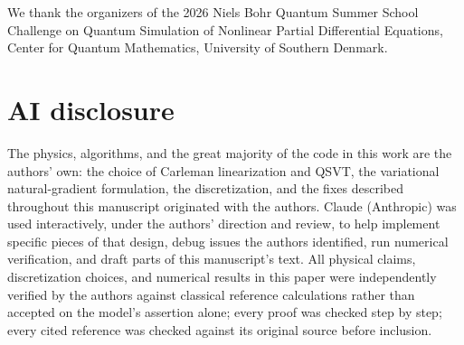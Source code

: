 \documentclass[aps,pra,twocolumn,notitlepage,superscriptaddress,floatfix,10pt]{revtex4-2}
\begin{document}
\begin{acknowledgments}
We thank the organizers of the 2026 Niels Bohr Quantum Summer School Challenge on Quantum Simulation
of Nonlinear Partial Differential Equations, Center for Quantum Mathematics, University of Southern
Denmark.
\end{acknowledgments}

\section*{AI disclosure}
The physics, algorithms, and the great majority of the code in this work are the authors' own: the
choice of Carleman linearization and QSVT, the variational natural-gradient formulation, the
discretization, and the fixes described throughout this manuscript originated with the authors.
Claude (Anthropic) was used interactively, under the authors' direction and review, to help implement
specific pieces of that design, debug issues the authors identified, run numerical verification, and
draft parts of this manuscript's text. All physical claims, discretization choices, and numerical
results in this paper were independently verified by the authors against classical reference
calculations rather than accepted on the model's assertion alone; every proof was checked step by
step; every cited reference was checked against its original source before inclusion.
\end{document}
